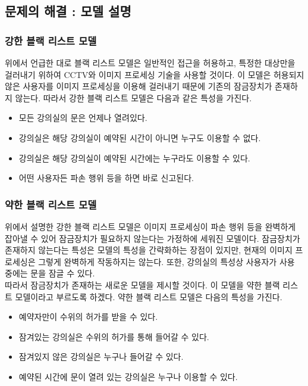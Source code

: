 \documentclass[11pt,a4paper]{article}
\begin{document}
\subsection{문제의 해결 : 모델 설명}

\subsubsection{강한 블랙 리스트 모델}
위에서 언급한 대로 블랙 리스트 모델은 일반적인 접근을 허용하고, 특정한 대상만을 걸러내기 위하여 CCTV와 이미지 프로세싱 기술을 사용할 것이다. 이 모델은 허용되지 않은 사용자를 이미지 프로세싱을 이용해 걸러내기 때문에 기존의 잠금장치가 존재하지 않는다. 따라서 강한 블랙 리스트 모델은 다음과 같은 특성을 가진다.
\begin{itemize}
\item 모든 강의실의 문은 언제나 열려있다.
\item 강의실은 해당 강의실이 예약된 시간이 아니면 누구도 이용할 수 없다.
\item 강의실은 해당 강의실이 예약된 시간에는 누구라도 이용할 수 있다.
\item 어떤 사용자든 파손 행위 등을 하면 바로 신고된다.
\end{itemize}

\subsubsection{약한 블랙 리스트 모델}
위에서 설명한 강한 블랙 리스트 모델은 이미지 프로세싱이 파손 행위 등을 완벽하게 잡아낼 수 있어 잠금장치가 필요하지 않는다는 가정하에 세워진 모델이다. 잠금장치가 존재하지 않는다는 특성은 모델의 특성을 간략화하는 장점이 있지만, 현재의 이미지 프로세싱은 그렇게 완벽하게 작동하지는 않는다. 또한, 강의실의 특성상 사용자가 사용 중에는 문을 잠글 수 있다.\\
따라서 잠금장치가 존재하는 새로운 모델을 제시할 것이다. 이 모델을 약한 블랙 리스트 모델이라고 부르도록 하겠다. 약한 블랙 리스트 모델은 다음의 특성을 가진다.
\begin{itemize}
\item 예약자만이 수위의 허가를 받을 수 있다.
\item 잠겨있는 강의실은 수위의 허가를 통해 들어갈 수 있다.
\item 잠겨있지 않은 강의실은 누구나 들어갈 수 있다.
\item 예약된 시간에 문이 열려 있는 강의실은 누구나 이용할 수 있다.
\end{itemize}
\end{document}
